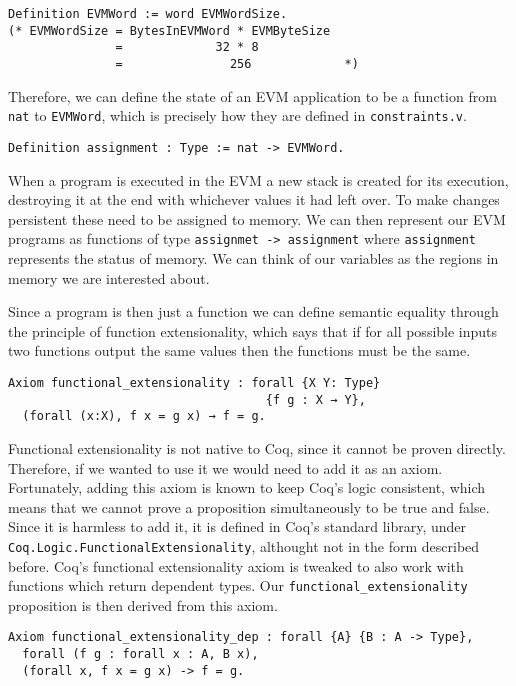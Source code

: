 \begin{verbatim}
Definition EVMWord := word EVMWordSize. 
(* EVMWordSize = BytesInEVMWord * EVMByteSize
               =             32 * 8
               =               256             *)
\end{verbatim}

Therefore, we can define the state of an EVM application to be a function from \texttt{nat} 
to \texttt{EVMWord}, which is precisely how they are defined in \verb|constraints.v|.

\begin{verbatim}
Definition assignment : Type := nat -> EVMWord.
\end{verbatim}

When a program is executed in the EVM a new stack is created for its execution, destroying it at the
end with whichever values it had left over. To make changes persistent these need to be assigned to
memory. We can then represent our EVM programs as functions of type
\texttt{assignmet -> assignment} where \texttt{assignment} represents the status of
memory. We can think of our variables as the regions in memory we are interested about.

Since a program is then just a function we can define semantic equality through the principle of
function extensionality, which says that if for all possible inputs two functions output the same
values then the functions must be the same.

\begin{verbatim}
Axiom functional_extensionality : forall {X Y: Type}
                                    {f g : X → Y},
  (forall (x:X), f x = g x) → f = g.
\end{verbatim}

Functional extensionality is not native to Coq, since it cannot be proven directly. Therefore, if we
wanted to use it we would need to add it as an axiom. Fortunately, adding this axiom is known to keep
Coq's logic consistent, which means that we cannot prove a proposition simultaneously to be true and 
false. Since it is harmless to add it, it is defined in Coq's standard library, under 
\texttt{Coq.Logic.FunctionalExtensionality}, althought not in the form described before. Coq's functional
extensionality axiom is tweaked to also work with functions which return dependent types. Our 
\texttt{functional_extensionality} proposition is then derived from this axiom.

\begin{verbatim}
Axiom functional_extensionality_dep : forall {A} {B : A -> Type},
  forall (f g : forall x : A, B x),
  (forall x, f x = g x) -> f = g.
\end{verbatim}

